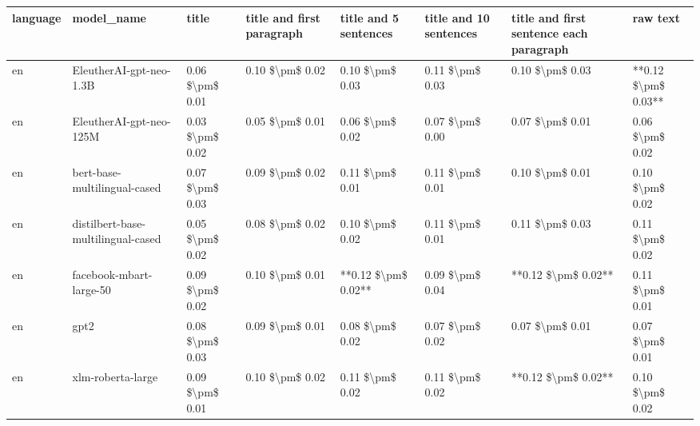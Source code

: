 \begin{tabular}{llllllll}
\toprule
language &                         model\_name &           title & title and first paragraph & title and 5 sentences & title and 10 sentences & title and first sentence each paragraph &            raw text \\
\midrule
      en &            EleutherAI-gpt-neo-1.3B & 0.06 \$\textbackslash pm\$ 0.01 &           0.10 \$\textbackslash pm\$ 0.02 &       0.10 \$\textbackslash pm\$ 0.03 &        0.11 \$\textbackslash pm\$ 0.03 &                         0.10 \$\textbackslash pm\$ 0.03 & **0.12 \$\textbackslash pm\$ 0.03** \\
      en &            EleutherAI-gpt-neo-125M & 0.03 \$\textbackslash pm\$ 0.02 &           0.05 \$\textbackslash pm\$ 0.01 &       0.06 \$\textbackslash pm\$ 0.02 &        0.07 \$\textbackslash pm\$ 0.00 &                         0.07 \$\textbackslash pm\$ 0.01 &     0.06 \$\textbackslash pm\$ 0.02 \\
      en &       bert-base-multilingual-cased & 0.07 \$\textbackslash pm\$ 0.03 &           0.09 \$\textbackslash pm\$ 0.02 &       0.11 \$\textbackslash pm\$ 0.01 &        0.11 \$\textbackslash pm\$ 0.01 &                         0.10 \$\textbackslash pm\$ 0.01 &     0.10 \$\textbackslash pm\$ 0.02 \\
      en & distilbert-base-multilingual-cased & 0.05 \$\textbackslash pm\$ 0.02 &           0.08 \$\textbackslash pm\$ 0.02 &       0.10 \$\textbackslash pm\$ 0.02 &        0.11 \$\textbackslash pm\$ 0.01 &                         0.11 \$\textbackslash pm\$ 0.03 &     0.11 \$\textbackslash pm\$ 0.02 \\
      en &            facebook-mbart-large-50 & 0.09 \$\textbackslash pm\$ 0.02 &           0.10 \$\textbackslash pm\$ 0.01 &   **0.12 \$\textbackslash pm\$ 0.02** &        0.09 \$\textbackslash pm\$ 0.04 &                     **0.12 \$\textbackslash pm\$ 0.02** &     0.11 \$\textbackslash pm\$ 0.01 \\
      en &                               gpt2 & 0.08 \$\textbackslash pm\$ 0.03 &           0.09 \$\textbackslash pm\$ 0.01 &       0.08 \$\textbackslash pm\$ 0.02 &        0.07 \$\textbackslash pm\$ 0.02 &                         0.07 \$\textbackslash pm\$ 0.01 &     0.07 \$\textbackslash pm\$ 0.01 \\
      en &                  xlm-roberta-large & 0.09 \$\textbackslash pm\$ 0.01 &           0.10 \$\textbackslash pm\$ 0.02 &       0.11 \$\textbackslash pm\$ 0.02 &        0.11 \$\textbackslash pm\$ 0.02 &                     **0.12 \$\textbackslash pm\$ 0.02** &     0.10 \$\textbackslash pm\$ 0.02 \\

\end{tabular}
